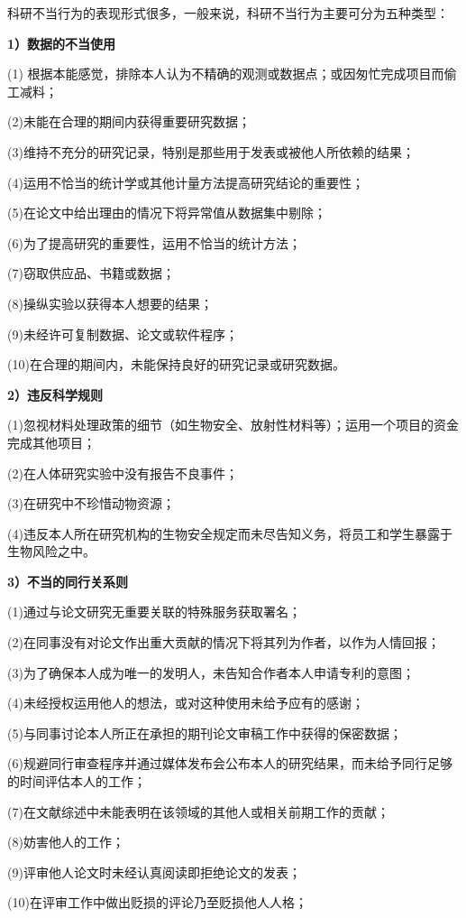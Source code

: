 科研不当行为的表现形式很多，一般来说，科研不当行为主要可分为五种类型：

\textbf{1）数据的不当使用}

(1) 根据本能感觉，排除本人认为不精确的观测或数据点；或因匆忙完成项目而偷工减料；

(2)未能在合理的期间内获得重要研究数据；

(3)维持不充分的研究记录，特别是那些用于发表或被他人所依赖的结果；

(4)运用不恰当的统计学或其他计量方法提高研究结论的重要性；

(5)在论文中给出理由的情况下将异常值从数据集中剔除；

(6)为了提高研究的重要性，运用不恰当的统计方法；

(7)窃取供应品、书籍或数据；

(8)操纵实验以获得本人想要的结果；

(9)未经许可复制数据、论文或软件程序；

(10)在合理的期间内，未能保持良好的研究记录或研究数据。

\textbf{2）违反科学规则}

(1)忽视材料处理政策的细节（如生物安全、放射性材料等）；运用一个项目的资金完成其他项目；

(2)在人体研究实验中没有报告不良事件；

(3)在研究中不珍惜动物资源；

(4)违反本人所在研究机构的生物安全规定而未尽告知义务，将员工和学生暴露于生物风险之中。

\textbf{3）不当的同行关系则}

(1)通过与论文研究无重要关联的特殊服务获取署名；

(2)在同事没有对论文作出重大贡献的情况下将其列为作者，以作为人情回报；

(3)为了确保本人成为唯一的发明人，未告知合作者本人申请专利的意图；

(4)未经授权运用他人的想法，或对这种使用未给予应有的感谢；

(5)与同事讨论本人所正在承担的期刊论文审稿工作中获得的保密数据；

(6)规避同行审查程序并通过媒体发布会公布本人的研究结果，而未给予同行足够的时间评估本人的工作；

(7)在文献综述中未能表明在该领域的其他人或相关前期工作的贡献；

(8)妨害他人的工作；

(9)评审他人论文时未经认真阅读即拒绝论文的发表；

(10)在评审工作中做出贬损的评论乃至贬损他人人格；

